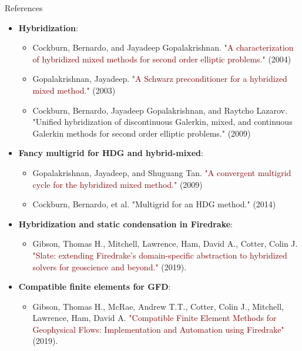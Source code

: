 \documentclass[9pt]{beamer}
\begin{document}
\begin{frame}[c]{References}
	\begin{itemize}
		\item \textbf{Hybridization}:
		\begin{itemize}
			\item Cockburn, Bernardo, and Jayadeep Gopalakrishnan. \textcolor{maroon}{"A characterization of hybridized mixed methods for second order elliptic problems."} (2004)
			\item Gopalakrishnan, Jayadeep. \textcolor{maroon}{"A Schwarz preconditioner for a hybridized mixed method."} (2003)
			\item Cockburn, Bernardo, Jayadeep Gopalakrishnan, and Raytcho Lazarov. "Unified hybridization of discontinuous Galerkin, mixed, and continuous Galerkin methods for second order elliptic problems." (2009)
		\end{itemize}
		\item \textbf{Fancy multigrid for HDG and hybrid-mixed}:
		\begin{itemize}
			\item Gopalakrishnan, Jayadeep, and Shuguang Tan. \textcolor{maroon}{"A convergent multigrid cycle for the hybridized mixed method."} (2009)
			\item Cockburn, Bernardo, et al. "Multigrid for an HDG method." (2014)
		\end{itemize}
		\item \textbf{Hybridization and static condensation in Firedrake}:
		\begin{itemize}
			\item Gibson, Thomas H., Mitchell, Lawrence, Ham, David A., Cotter, Colin J. \textcolor{maroon}{"Slate: extending Firedrake’s domain-specific abstraction to hybridized solvers for geoscience and beyond."} (2019).
		\end{itemize}
		\item \textbf{Compatible finite elements for GFD}:
		\begin{itemize}
			\item Gibson, Thomas H., McRae, Andrew T.T., Cotter, Colin J.,
			Mitchell, Lawrence, Ham, David A. \textcolor{maroon}{"Compatible Finite Element Methods for Geophysical Flows: Implementation and Automation using Firedrake"} (2019).
		\end{itemize}
	\end{itemize}
\end{frame}
\end{document}
